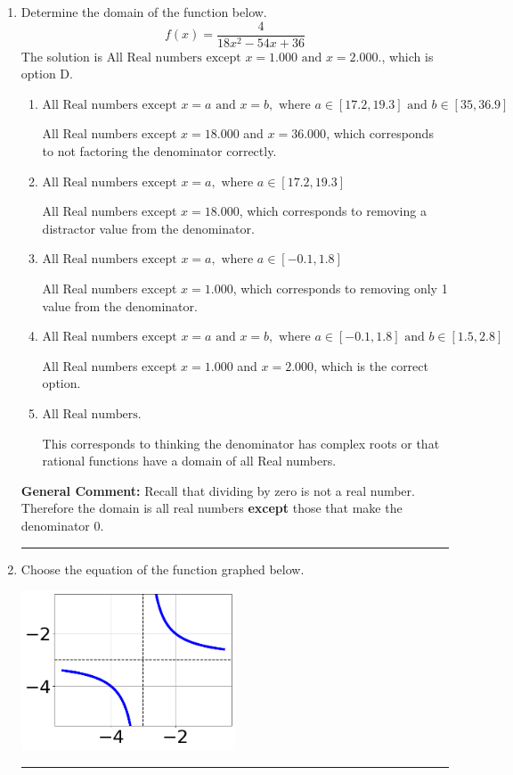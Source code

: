\documentclass{extbook}[14pt]
\newcommand{\litem}[1]{\item #1

\rule{\textwidth}{0.4pt}}
\begin{document}
\begin{enumerate}\litem{
Determine the domain of the function below.
\[ f(x) = \frac{4}{18x^{2} -54 x + 36} \]The solution is \( \text{All Real numbers except } x = 1.000 \text{ and } x = 2.000. \), which is option D.\begin{enumerate}[label=\Alph*.]
\item \( \text{All Real numbers except } x = a \text{ and } x = b, \text{ where } a \in [17.2, 19.3] \text{ and } b \in [35, 36.9] \)

All Real numbers except $x = 18.000$ and $x = 36.000$, which corresponds to not factoring the denominator correctly.
\item \( \text{All Real numbers except } x = a, \text{ where } a \in [17.2, 19.3] \)

All Real numbers except $x = 18.000$, which corresponds to removing a distractor value from the denominator.
\item \( \text{All Real numbers except } x = a, \text{ where } a \in [-0.1, 1.8] \)

All Real numbers except $x = 1.000$, which corresponds to removing only 1 value from the denominator.
\item \( \text{All Real numbers except } x = a \text{ and } x = b, \text{ where } a \in [-0.1, 1.8] \text{ and } b \in [1.5, 2.8] \)

All Real numbers except $x = 1.000$ and $x = 2.000$, which is the correct option.
\item \( \text{All Real numbers.} \)

This corresponds to thinking the denominator has complex roots or that rational functions have a domain of all Real numbers.
\end{enumerate}

\textbf{General Comment:} Recall that dividing by zero is not a real number. Therefore the domain is all real numbers \textbf{except} those that make the denominator 0.
}
\litem{
Choose the equation of the function graphed below.

\begin{center}
    \includegraphics[width=0.5\textwidth]{../Figures/rationalGraphToEquationCopyB.png}
\end{center}


}
\end{enumerate}
\end{document}
